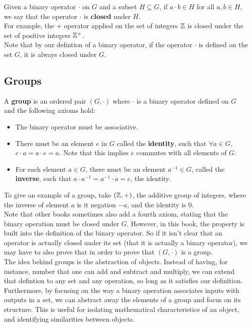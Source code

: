 \documentclass[12pt]{article}
\begin{document}
    Given a binary operator $\cdot$ on $G$
    and a subset $H \subseteq G$,
    if $a \cdot b \in H$ for all $a, b \in H$,
    we say that the operator $\cdot$ is \textbf{closed} under $H$. \\
    For example,
    the $+$ operator applied on the set of integers $\mathbb{Z}$
    is closed under the set of positive integers $\mathbb{Z}^+$. \\
    Note that by our defintion of a binary operator,
    if the operator $\cdot$ is defined on the set $G$,
    it is always closed under $G$. \\
    

    \subsection*{Groups}

    A \textbf{group} is an ordered pair $(G, \cdot)$
    where $\cdot$ is a binary operator defined on $G$
    and the following axioms hold:
    \begin{itemize}[label=$\diamond$]
        \item 
            The binary operator must be associative.
        \item 
            There must be an element $e$ in $G$ called the \textbf{identity},
            such that $\forall a \in G$,
            $e \cdot a = a \cdot e = a$.
            Note that this implies $e$ commutes with all elements of $G$.
        \item
            For each element $a \in G$,
            there must be an element $a^{-1} \in G$,
            called the \textbf{inverse},
            such that $a \cdot a^{-1} = a^{-1} \cdot a = e$,
            the identity.
    \end{itemize}
    To give an example of a group,
    take $(\mathbb{Z}, +)$,
    the additive group of integers,
    where the inverse of element $a$ is it negation $-a$,
    and the identity is $0$. \\ 
    Note that other books sometimes also add a fourth axiom,
    stating that the binary operation must be closed under $G$.
    However, in this book, the property is built into the definition
    of the binary operator.
    So if it isn't clear that an operator is actually
    closed under its set (that it is actually a binary operator),
    we may have to also prove that
    in order to prove that $(G, \cdot)$ is a group. \\

    The idea behind groups is the abstraction of objects.
    Instead of having, for instance,
    number that one can add and subtract and multiply,
    we can extend that defintion to any set and any operation,
    so long as it satisfies our definition. \\
    Furthermore,
    by focusing on the way a binary operation associates inputs
    with outputs in a set,
    we can abstract away the elements of a group and focus on its structure.
    This is useful for isolating mathematical characteristics of an object,
    and identifying similarities between objects. \\
\end{document}
